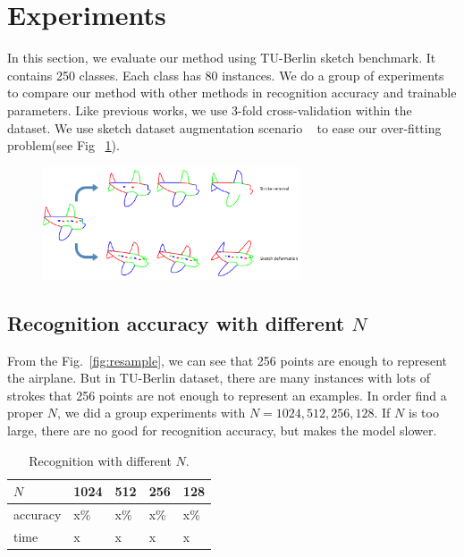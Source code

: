 \section{Experiments}
\label{sec:experiments}
In this section, we evaluate our method using  TU-Berlin sketch benchmark. It contains 250 classes. Each class has 80 instances. We do a group of experiments to compare our method with other methods in recognition accuracy and trainable parameters. Like previous works, we use 3-fold cross-validation within the dataset.  We use sketch dataset augmentation scenario  ~\cite{Yu2015SketchaNetTB} to ease our over-fitting problem(see Fig ~\ref{fig:aug_data}).

\begin{figure}[htbp]
    \center
    \includegraphics[width=3in]{images/aug_data.png}
    \label{fig:aug_data}
\end{figure}

\subsection{Recognition accuracy with different $N$}
\label{ssec:resample_number}

From the Fig.~\ref{fig:resample}, we can see that 256 points are enough to represent the airplane. But in TU-Berlin dataset, there are many instances with lots of strokes that 256 points are not enough to represent an examples. In order find a proper $N$, we did a group experiments with $N = 1024, 512, 256, 128$. If $N$ is too large, there are no good for recognition accuracy, but makes the model slower.

\begin{table}[htbp]
\begin{tabular}{|p{1.4cm}|p{1.3cm}|p{1.3cm}|p{1.3cm}|p{1.3cm}|}
    \hline
     $N$ & 1024& 512 & 256 & 128\\
    \hline
     accuracy & x\% & x\% & x\%& x\%\\
    \hline
     time & x & x & x& x\\
    \hline
\end{tabular}
\caption{Recognition with different $N$.}
\end{table}

